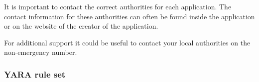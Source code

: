 It is important to contact the correct authorities for each application. 
The contact information for these authorities can often be found inside the application or on the website of the creator of the application.

For additional support it could be useful to contact your local authorities on the non-emergency number.

\subsubsection{YARA rule set}

% 
